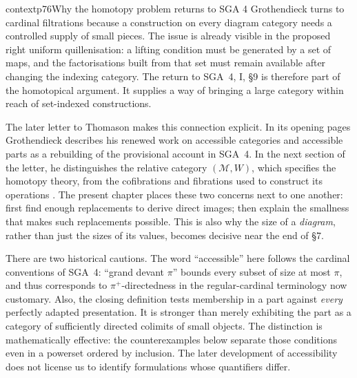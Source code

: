 \begin{dcomment}{context}{p76}{Why the homotopy problem returns to SGA 4}
Grothendieck turns to cardinal filtrations because a construction on every diagram category needs a controlled supply of small pieces. The issue is already visible in the proposed right uniform quillenisation: a lifting condition must be generated by a set of maps, and the factorisations built from that set must remain available after changing the indexing category. The return to SGA~4, I, \S9 is therefore part of the homotopical argument. It supplies a way of bringing a large category within reach of set-indexed constructions.

The later letter to Thomason makes this connection explicit. In its opening pages Grothendieck describes his renewed work on accessible categories and accessible parts as a rebuilding of the provisional account in SGA~4. In the next section of the letter, he distinguishes the relative category $(\mathcal M,W)$, which specifies the homotopy theory, from the cofibrations and fibrations used to construct its operations \citep[pp.~2--4 of the electronic edition]{Grothendieck1991Letter}. The present chapter places these two concerns next to one another: first find enough replacements to derive direct images; then explain the smallness that makes such replacements possible. This is also why the size of a \emph{diagram}, rather than just the sizes of its values, becomes decisive near the end of \S7.

There are two historical cautions. The word ``accessible'' here follows the cardinal conventions of SGA~4: ``grand devant $\pi$'' bounds every subset of size at most $\pi$, and thus corresponds to $\pi^+$-directedness in the regular-cardinal terminology now customary. Also, the closing definition tests membership in a part against \emph{every} perfectly adapted presentation. It is stronger than merely exhibiting the part as a category of sufficiently directed colimits of small objects. The distinction is mathematically effective: the counterexamples below separate those conditions even in a powerset ordered by inclusion. The later development of accessibility does not license us to identify formulations whose quantifiers differ.
\end{dcomment}


